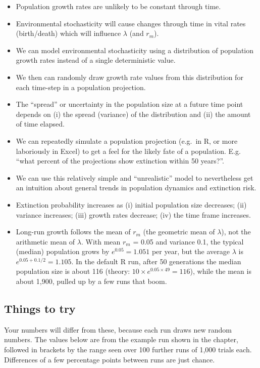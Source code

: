 \documentclass[
  a4paper]{book}
\providecommand{\tightlist}{%
  \setlength{\itemsep}{0pt}\setlength{\parskip}{0pt}}
\begin{document}
\begin{itemize}
\tightlist
\item
  Population growth rates are unlikely to be constant through time.
\item
  Environmental stochasticity will cause changes through time in vital rates (birth/death) which will influence \(\lambda\) (and \(r_m\)).
\item
  We can model environmental stochasticity using a distribution of population growth rates instead of a single deterministic value.
\item
  We then can randomly draw growth rate values from this distribution for each time-step in a population projection.
\item
  The ``spread'' or uncertainty in the population size at a future time point depends on (i) the spread (variance) of the distribution and (ii) the amount of time elapsed.
\item
  We can repeatedly simulate a population projection (e.g.~in R, or more laboriously in Excel) to get a feel for the likely fate of a population. E.g. ``what percent of the projections show extinction within 50 years?''.
\item
  We can use this relatively simple and ``unrealistic'' model to nevertheless get an intuition about general trends in population dynamics and extinction risk.
\item
  Extinction probability increases as (i) initial population size decreases; (ii) variance increases; (iii) growth rates decrease; (iv) the time frame increases.
\item
  Long-run growth follows the mean of \(r_m\) (the geometric mean of \(\lambda\)), not the arithmetic mean of \(\lambda\). With mean \(r_m\) = 0.05 and variance 0.1, the typical (median) population grows by \(e^{0.05} = 1.051\) per year, but the average \(\lambda\) is \(e^{0.05 + 0.1/2} = 1.105\). In the default R run, after 50 generations the median population size is about 116 (theory: \(10 \times e^{0.05 \times 49} = 116\)), while the mean is about 1,900, pulled up by a few runs that boom.
\end{itemize}

\subsection{Things to try}\label{things-to-try-1}

Your numbers will differ from these, because each run draws new random numbers. The values below are from the example run shown in the chapter, followed in brackets by the range seen over 100 further runs of 1,000 trials each. Differences of a few percentage points between runs are just chance.
\end{document}

